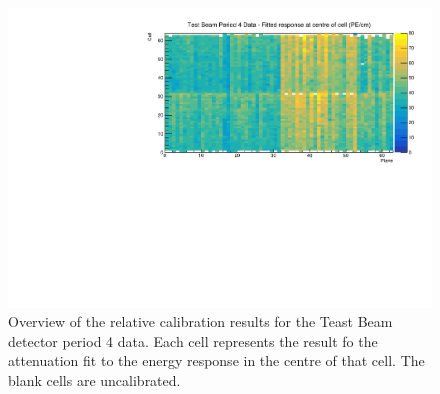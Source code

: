 \documentclass[12pt,a4paper]{article}
\begin{document}
\begin{figure}[!hbtp]
\centering
\includegraphics[width=\textwidth]{Plots/CellResponseAtCentre_period4_Limited.pdf}
\caption{Overview of the relative calibration results for the Teast Beam detector period 4 data. Each cell represents the result fo the attenuation fit to the energy response in the centre of that cell. The blank cells are uncalibrated.}
\label{figCellCentreResponsePeriod4}
\end{figure}
\end{document}

